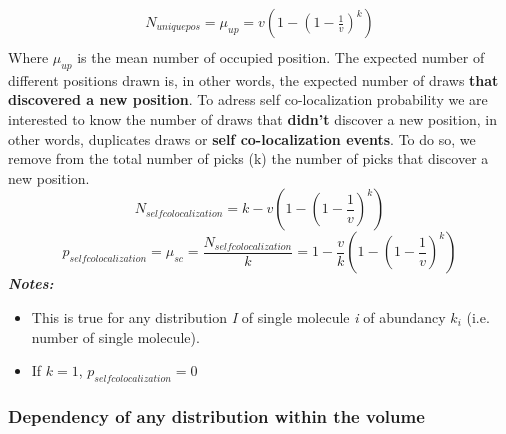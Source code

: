 \documentclass{article}
\begin{document}
\begin{equation}
    \begin{split}
    N_{uniquepos} = \mu_{up} = v(1-(1-\frac{1}{v})^k) \\
    \end{split}
\end{equation}
Where $\mu_{up}$ is the mean number of occupied position.
The expected number of different positions drawn is, in other words, the expected number of draws \textbf{that discovered a new position}.
To adress self co-localization probability we are interested to know the number of draws that \textbf{didn't} discover a new position,
in other words, duplicates draws or \textbf{self co-localization events}. To do so, we remove from the total number of picks (k) the
number of picks that discover a new position.
\[
N_{self colocalization} = k - v(1-(1-\frac{1}{v})^k)
\]
\begin{equation}
p_{self colocalization} = \mu_{sc} = \frac{N_{self colocalization}}{k} = 1 - \frac{v}{k}(1-(1-\frac{1}{v})^k)
\end{equation}
\textit{\textbf{Notes:}}
\begin{itemize}
    \item This is true for any distribution \textit{I} of single molecule \textit{i} of abundancy $ k_i $ (i.e. number of single molecule).
    \item If $k = 1$, $p_{self colocalization} = 0$
\end{itemize}

\subsubsection{Dependency of any distribution within the volume}
\end{document}
